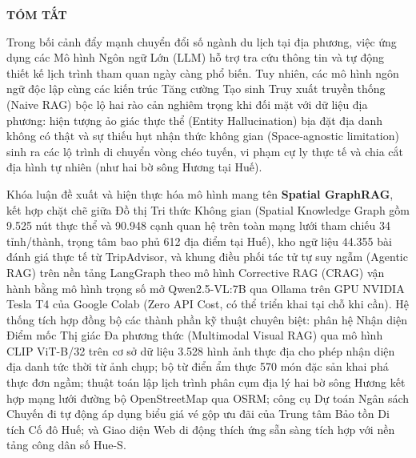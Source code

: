 \clearpage
{}
{}
\enlargethispage{2.0cm}

\begin{center}
\vspace*{-1.0cm}
{\fontsize{12pt}{14.5pt}\selectfont \bfseries \tendetaiInHoa\par}
\vspace{0.1cm}

{\fontsize{13pt}{16pt}\selectfont \bfseries TÓM TẮT\par}
\vspace{0.15cm}
\end{center}

\begingroup
\fontsize{11pt}{13.8pt}\selectfont
\setlength{\parskip}{2pt}

Trong bối cảnh đẩy mạnh chuyển đổi số ngành du lịch tại địa phương, việc ứng dụng các Mô hình Ngôn ngữ Lớn (LLM) hỗ trợ tra cứu thông tin và tự động thiết kế lịch trình tham quan ngày càng phổ biến. Tuy nhiên, các mô hình ngôn ngữ độc lập cùng các kiến trúc Tăng cường Tạo sinh Truy xuất truyền thống (Naive RAG) bộc lộ hai rào cản nghiêm trọng khi đối mặt với dữ liệu địa phương: hiện tượng ảo giác thực thể (Entity Hallucination) bịa đặt địa danh không có thật và sự thiếu hụt nhận thức không gian (Space-agnostic limitation) sinh ra các lộ trình di chuyển vòng chéo tuyến, vi phạm cự ly thực tế và chia cắt địa hình tự nhiên (như hai bờ sông Hương tại Huế).

Khóa luận đề xuất và hiện thực hóa mô hình mang tên \textbf{Spatial GraphRAG}, kết hợp chặt chẽ giữa Đồ thị Tri thức Không gian (Spatial Knowledge Graph gồm 9.525 nút thực thể và 90.948 cạnh quan hệ trên toàn mạng lưới tham chiếu 34 tỉnh/thành, trọng tâm bao phủ 612 địa điểm tại Huế), kho ngữ liệu 44.355 bài đánh giá thực tế từ TripAdvisor, và khung điều phối tác tử tự suy ngẫm (Agentic RAG) trên nền tảng LangGraph theo mô hình Corrective RAG (CRAG) vận hành bằng mô hình trọng số mở Qwen2.5-VL:7B qua Ollama trên GPU NVIDIA Tesla T4 của Google Colab (Zero API Cost, có thể triển khai tại chỗ khi cần). Hệ thống tích hợp đồng bộ các thành phần kỹ thuật chuyên biệt: phân hệ Nhận diện Điểm mốc Thị giác Đa phương thức (Multimodal Visual RAG) qua mô hình CLIP ViT-B/32 trên cơ sở dữ liệu 3.528 hình ảnh thực địa cho phép nhận diện địa danh tức thời từ ảnh chụp; bộ từ điển ẩm thực 570 món đặc sản khai phá thực đơn ngầm; thuật toán lập lịch trình phân cụm địa lý hai bờ sông Hương kết hợp mạng lưới đường bộ OpenStreetMap qua OSRM; công cụ Dự toán Ngân sách Chuyến đi tự động áp dụng biểu giá vé gộp ưu đãi của Trung tâm Bảo tồn Di tích Cố đô Huế; và Giao diện Web di động thích ứng sẵn sàng tích hợp với nền tảng công dân số Hue-S.

